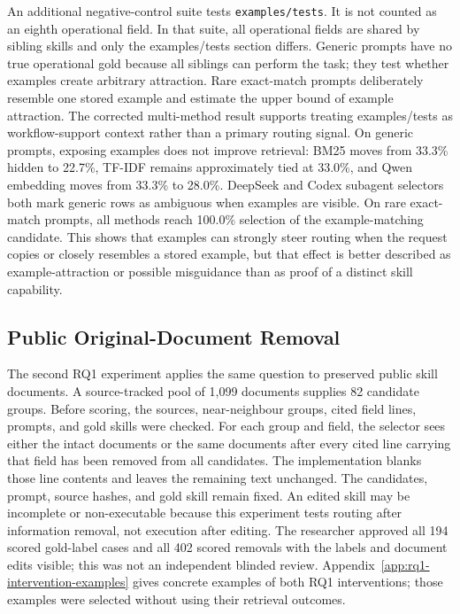 An additional negative-control suite tests \texttt{examples/tests}. It is not counted as an eighth operational field. In that suite, all operational fields are shared by sibling skills and only the examples/tests section differs. Generic prompts have no true operational gold because all siblings can perform the task; they test whether examples create arbitrary attraction. Rare exact-match prompts deliberately resemble one stored example and estimate the upper bound of example attraction. The corrected multi-method result supports treating examples/tests as workflow-support context rather than a primary routing signal. On generic prompts, exposing examples does not improve retrieval: BM25 moves from 33.3\% hidden to 22.7\%, TF-IDF remains approximately tied at 33.0\%, and Qwen embedding moves from 33.3\% to 28.0\%. DeepSeek and Codex subagent selectors both mark generic rows as ambiguous when examples are visible. On rare exact-match prompts, all methods reach 100.0\% selection of the example-matching candidate. This shows that examples can strongly steer routing when the request copies or closely resembles a stored example, but that effect is better described as example-attraction or possible misguidance than as proof of a distinct skill capability.

\subsection{Public Original-Document Removal}

The second RQ1 experiment applies the same question to preserved public skill documents. A source-tracked pool of 1,099 documents supplies 82 candidate groups. Before scoring, the sources, near-neighbour groups, cited field lines, prompts, and gold skills were checked. For each group and field, the selector sees either the intact documents or the same documents after every cited line carrying that field has been removed from all candidates. The implementation blanks those line contents and leaves the remaining text unchanged. The candidates, prompt, source hashes, and gold skill remain fixed. An edited skill may be incomplete or non-executable because this experiment tests routing after information removal, not execution after editing. The researcher approved all 194 scored gold-label cases and all 402 scored removals with the labels and document edits visible; this was not an independent blinded review. Appendix~\ref{app:rq1-intervention-examples} gives concrete examples of both RQ1 interventions; those examples were selected without using their retrieval outcomes.

